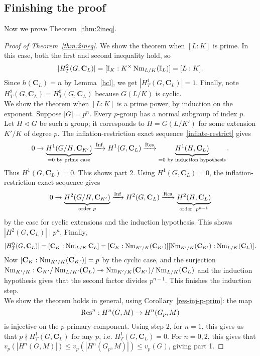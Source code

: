 \subsection{Finishing the proof}
Now we prove Theorem~\ref{thm:2ineq}.
\begin{proof}[Proof of Theorem~\ref{thm:2ineq}]
 We show the theorem when $[L:K]$ is prime. In this case, both the first and second inequality hold, so 
\[
|H_T^2(G,\mathbf C_L)|=[\mathbb{I}_K:K^{\times}\operatorname{Nm}_{L/K}(\mathbb{I}_L)]=[L:K].
\]
Since $h(\mathbf C_L)=n$ by Lemma~\ref{hcl}, we get $|H_T^1(G,\mathbf C_L)|=1$. Finally, note $H_T^2(G,\mathbf C_L)=H_T^0(G,\mathbf C_L)$ because $G(L/K)$ is cyclic.\\

 We show the theorem when $[L:K]$ is a prime power, by induction on the exponent. Suppose $|G|=p^n$. Every $p$-group has a normal subgroup of index $p$. Let $H\triangleleft G$ be such a group; it corresponds to $H=G(L/K')$ for some extension $K'/K$ of degree $p$. The inflation-restriction exact sequence~\ref{inflate-restrict} gives
\[
0\to \underbrace{H^1(G/H,\mathbf C_{K'})}_{=0\text{ by prime case}} \xrightarrow{\operatorname{Inf}} H^1(G,\mathbf C_L) \xrightarrow{\operatorname{Res}} \underbrace{H^1(H,\mathbf C_L)}_{=0\text{ by induction hypothesis}}.
\]
Thus $H^1(G,\mathbf C_L)=0$. This shows part 2. Using $H^1(G,\mathbf C_L)=0$, the inflation-restriction exact sequence gives
\[
0\to \underbrace{H^2(G/H,\mathbf C_{K'})}_{\text{order }p} \xrightarrow{\operatorname{Inf}} H^2(G,\mathbf C_L) \xrightarrow{\operatorname{Res}} \underbrace{H^2(H,\mathbf C_L)}_{\text{order }\mid p^{n-1}}
\]
by the case for cyclic extensions and the induction hypothesis. This shows $|H^2(G,\mathbf C_L)|\mid  p^n$. Finally,
\[
|H_T^0(G,\mathbf C_L)|=[\mathbf C_K:\operatorname{Nm}_{L/K}\mathbf C_L]
=[\mathbf C_K:\operatorname{Nm}_{K'/K}(\mathbf C_{K'})][\operatorname{Nm}_{K'/K}(\mathbf C_{K'}):\operatorname{Nm}_{L/K}(\mathbf C_L)].
\]
Now $[\mathbf C_K:\operatorname{Nm}_{K'/K}(\mathbf C_{K'})]=p$ by the cyclic case, and the surjection $\operatorname{Nm}_{K'/K}:\mathbf C_{K'}/\operatorname{Nm}_{L/K'}(\mathbf C_L)\twoheadrightarrow \operatorname{Nm}_{K'/K}(\mathbf C_{K'})/\operatorname{Nm}_{L/K}(\mathbf C_L)$ and the induction hypothesis gives that the second factor divides $p^{n-1}$. This finishes the induction step.\\

 We show the theorem holds in general, using Corollary~\ref{res-inj-p-prim}: the map
\[
\operatorname{Res}^n:H^n(G,M)\to H^n(G_p,M)
\]
is injective on the $p$-primary component. Using step 2, for $n=1$, this gives us that $p\nmid H_T^1(G,\mathbf C_L)$ for any $p$, i.e. $H_T^1(G,\mathbf C_L)=0$. For $n=0,2$, this gives that $v_p(|H^n(G,M)|)\le v_p(|H^n(G_p,M)|)\le v_p(G)$, giving part 1.
\end{proof}
